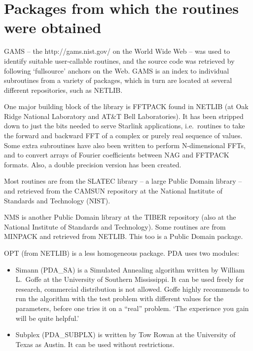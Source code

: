 
\section{Packages from which the routines were obtained}

   GAMS -- the
{http://gams.nist.gov/}
   on the World Wide Web -- was used to identify suitable user-callable
   routines, and the source code was retrieved by following `fullsource'
   anchors on the Web. GAMS is an index to individual subroutines from a
   variety of packages, which in turn are located at several different
   repositories, such as NETLIB.

   One major building block of the library is FFTPACK found in NETLIB (at
   Oak Ridge National Laboratory and AT\&T Bell Laboratories).
   It has been stripped down to just the bits needed to serve Starlink
   applications, i.e.\ routines to take the forward and backward FFT
   of a complex or purely real sequence of values. Some extra
   subroutines have also been written to perform N-dimensional FFTs, and
   to convert arrays of Fourier coefficients between NAG and FFTPACK
   formats. Also, a double precision version has been created.

   Most routines are from the SLATEC library -- a large Public Domain
   library -- and retrieved from the CAMSUN repository at the National
   Institute of Standards and Technology (NIST).

   NMS is another Public Domain library at the TIBER repository (also at
   the National Institute of Standards and Technology).
   Some routines are from MINPACK and retrieved from NETLIB. This too is
   a Public Domain package.

   OPT (from NETLIB) is a less homogeneous package. PDA uses two modules:

\begin{itemize}
\item Simann (PDA\_SA) is a Simulated Annealing algorithm written by
   William L.\ Goffe at the University of Southern Mississippi. It can
   be used freely for research, commercial distribution is not allowed.
   Goffe highly recommends to run the 
   algorithm with the test problem with different values for the
   parameters, before one tries it on a ``real'' problem. `The experience
   you gain will be quite helpful.'
\item Subplex (PDA\_SUBPLX) is written by Tow Rowan at the University of
   Texas as Austin. It can be used without restrictions.
\end{itemize}

